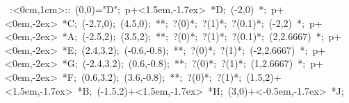 
%


\hbox{
\xy    <1cm,0cm>:<0cm,1cm>::
     (0,0)="D"; p+<1.5em,-1.7ex> *{D};  (-2,0) *{\bullet}; 
       p+<0em,-2ex> *{C};
       (-2.7,0); (4.5,0); **\dir{-}; ?(0)*\dir{<};
       ?(1)*\dir{>}; ?(0.1)*\dir{<<};
     (-2,2) *{\bullet}; p+<0em,-2ex> *{A};
       (-2.5,2); (3.5,2); **\dir{-}; ?(0)*\dir{<};
       ?(1)*\dir{>}; ?(0.1)*\dir{<<};
     (2,2.6667) *{\bullet}; p+<0em,-2ex> *{E};
       (2.4,3.2); (-0.6,-0.8); **\dir{-}; ?(0)*\dir{<};
       ?(1)*\dir{>};
     (-2,2.6667) *{\bullet}; p+<0em,-2ex> *{G};
       (-2.4,3.2); (0.6,-0.8); **\dir{-}; ?(0)*\dir{<};
       ?(1)*\dir{>};
     (1,2.6667) *{\bullet}; p+<0em,-2ex> *{F};
       (0.6,3.2); (3.6,-0.8); **\dir{-}; ?(0)*\dir{<};
       ?(1)*\dir{>};
     (1.5,2)+<1.5em,-1.7ex> *{B};
     (-1.5,2)+<1.5em,-1.7ex> *{H};
     (3,0)+<-0.5em,-1.7ex> *{J};
\endxy}



